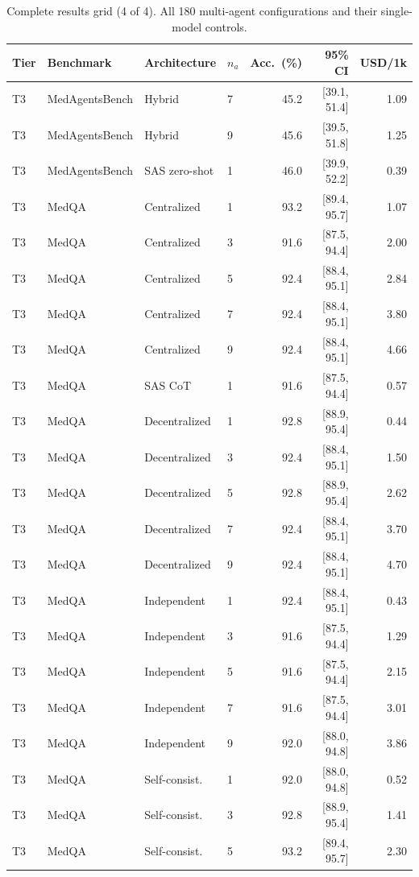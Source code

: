 \begin{table}[t]\centering\scriptsize
\caption{Complete results grid (4 of 4). All 180 multi-agent configurations and their single-model controls.}
\begin{tabular}{@{}llllrrr@{}}
\toprule
Tier & Benchmark & Architecture & $n_a$ & Acc.\ (\%) & 95\% CI & USD/1k \\
\midrule
T3 & MedAgentsBench & Hybrid & 7 & 45.2 & [39.1, 51.4] & 1.09 \\
T3 & MedAgentsBench & Hybrid & 9 & 45.6 & [39.5, 51.8] & 1.25 \\
T3 & MedAgentsBench & SAS zero-shot & 1 & 46.0 & [39.9, 52.2] & 0.39 \\
T3 & MedQA & Centralized & 1 & 93.2 & [89.4, 95.7] & 1.07 \\
T3 & MedQA & Centralized & 3 & 91.6 & [87.5, 94.4] & 2.00 \\
T3 & MedQA & Centralized & 5 & 92.4 & [88.4, 95.1] & 2.84 \\
T3 & MedQA & Centralized & 7 & 92.4 & [88.4, 95.1] & 3.80 \\
T3 & MedQA & Centralized & 9 & 92.4 & [88.4, 95.1] & 4.66 \\
T3 & MedQA & SAS CoT & 1 & 91.6 & [87.5, 94.4] & 0.57 \\
T3 & MedQA & Decentralized & 1 & 92.8 & [88.9, 95.4] & 0.44 \\
T3 & MedQA & Decentralized & 3 & 92.4 & [88.4, 95.1] & 1.50 \\
T3 & MedQA & Decentralized & 5 & 92.8 & [88.9, 95.4] & 2.62 \\
T3 & MedQA & Decentralized & 7 & 92.4 & [88.4, 95.1] & 3.70 \\
T3 & MedQA & Decentralized & 9 & 92.4 & [88.4, 95.1] & 4.70 \\
T3 & MedQA & Independent & 1 & 92.4 & [88.4, 95.1] & 0.43 \\
T3 & MedQA & Independent & 3 & 91.6 & [87.5, 94.4] & 1.29 \\
T3 & MedQA & Independent & 5 & 91.6 & [87.5, 94.4] & 2.15 \\
T3 & MedQA & Independent & 7 & 91.6 & [87.5, 94.4] & 3.01 \\
T3 & MedQA & Independent & 9 & 92.0 & [88.0, 94.8] & 3.86 \\
T3 & MedQA & Self-consist. & 1 & 92.0 & [88.0, 94.8] & 0.52 \\
T3 & MedQA & Self-consist. & 3 & 92.8 & [88.9, 95.4] & 1.41 \\
T3 & MedQA & Self-consist. & 5 & 93.2 & [89.4, 95.7] & 2.30 \\

\end{tabular}
\end{table}
